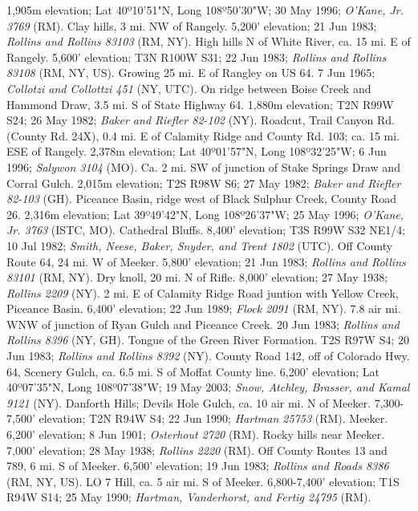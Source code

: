 1,905m elevation; Lat 40º10'51"N, Long 108º50'30"W; 30 May 1996;
\textit{O'Kane, Jr. 3769} (RM).
Clay hills, 3 mi. NW of Rangely. 5,200' elevation; 21 Jun 1983;
\textit{Rollins and Rollins 83103} (RM, NY).
High hills N of White River, ca. 15 mi. E of Rangely. 5,600' elevation;
T3N R100W S31; 22 Jun 1983; \textit{Rollins and Rollins 83108} (RM, NY, US).
Growing 25 mi. E of Rangley on US 64. 7 Jun 1965;
\textit{Collotzi and Collottzi 451} (NY, UTC).
On ridge between Boise Creek and Hammond Draw, 3.5 mi. S of State Highway 64.
1,880m elevation; T2N R99W S24; 26 May 1982;
\textit{Baker and Riefler 82-102} (NY).
Roadcut, Trail Canyon Rd. (County Rd. 24X), 0.4 mi. E of Calamity Ridge and
County Rd. 103; ca. 15 mi. ESE of Rangely. 2,378m elevation;
Lat 40º01'57"N, Long 108º32'25"W; 6 Jun 1996; \textit{Salywon 3104} (MO).
Ca. 2 mi. SW of junction of Stake Springs Draw and Corral Gulch. 2,015m
elevation; T2S R98W S6; 27 May 1982; \textit{Baker and Riefler 82-103} (GH).
Piceance Basin, ridge west of Black Sulphur Creek, County Road 26.
2,316m elevation; Lat 39º49'42"N, Long 108º26'37"W; 25 May 1996;
\textit{O'Kane, Jr. 3763} (ISTC, MO).
Cathedral Bluffs. 8,400' elevation; T3S R99W S32 NE1/4; 10 Jul 1982;
\textit{Smith, Neese, Baker, Snyder, and Trent 1802} (UTC).
Off County Route 64, 24 mi. W of Meeker. 5,800' elevation; 21 Jun 1983;
\textit{Rollins and Rollins 83101} (RM, NY).
Dry knoll, 20 mi. N of Rifle. 8,000' elevation; 27 May 1938;
\textit{Rollins 2209} (NY).
2 mi. E of Calamity Ridge Road juntion with Yellow Creek, Piceance Basin.
6,400' elevation; 22 Jun 1989; \textit{Flock 2091} (RM, NY).
7.8 air mi. WNW of junction of Ryan Gulch and Piceance Creek. 20 Jun 1983;
\textit{Rollins and Rollins 8396} (NY, GH).
Tongue of the Green River Formation. T2S R97W S4; 20 Jun 1983;
\textit{Rollins and Rollins 8392} (NY).
County Road 142, off of Colorado Hwy. 64, Scenery Gulch, ca. 6.5 mi. S of Moffat
County line. 6,200' elevation; Lat 40º07'35"N, Long 108º07'38"W; 19 May 2003;
\textit{Snow, Atchley, Brasser, and Kamal 9121} (NY).
Danforth Hills; Devils Hole Gulch, ca. 10 air mi. N of Meeker.
7,300-7,500' elevation; T2N R94W S4; 22 Jun 1990; \textit{Hartman 25753} (RM).
Meeker. 6,200' elevation; 8 Jun 1901; \textit{Osterhout 2720} (RM).
Rocky hills near Meeker. 7,000' elevation; 28 May 1938;
\textit{Rollins 2220} (RM).
Off County Routes 13 and 789, 6 mi. S of Meeker. 6,500' elevation; 19 Jun 1983;
\textit{Rollins and Roads 8386} (RM, NY, US).
LO 7 Hill, ca. 5 air mi. S of Meeker. 6,800-7,400' elevation; T1S R94W S14;
25 May 1990; \textit{Hartman, Vanderhorst, and Fertig 24795} (RM).
